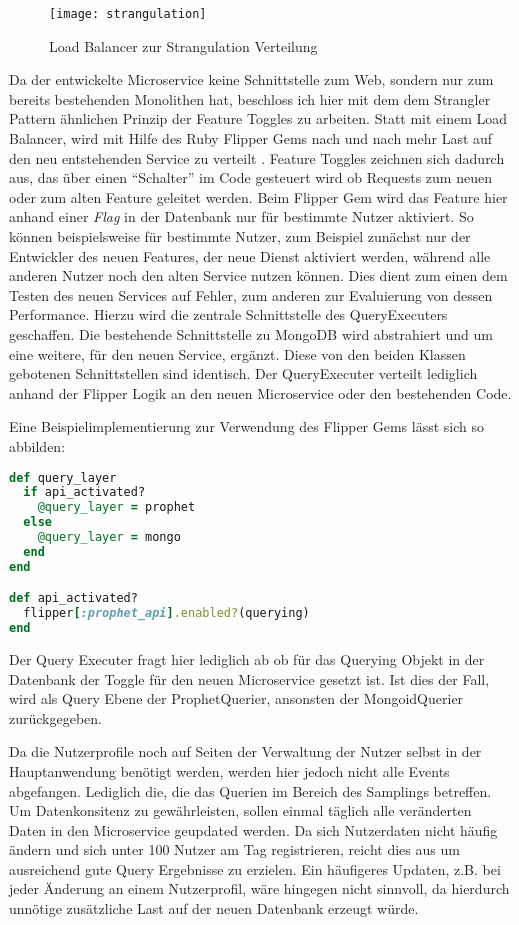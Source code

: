 \begin{figure}[h]
    \caption{Load Balancer zur Strangulation Verteilung \cite{Hammant:Strangler}}
    \texttt{[image: strangulation]}
\end{figure}

Da der entwickelte Microservice keine Schnittstelle zum Web, sondern nur zum bereits bestehenden Monolithen hat, beschloss ich hier mit dem dem Strangler Pattern ähnlichen Prinzip der Feature Toggles\cite{fowler:featuretoggle} zu arbeiten. Statt mit einem Load Balancer, wird mit Hilfe des Ruby Flipper Gems\cite{flipper} nach und nach mehr Last auf den neu entstehenden Service zu verteilt \cite[vgl.][]{Hammant:Strangler}.
Feature Toggles zeichnen sich dadurch aus, das über einen \enquote{Schalter} im Code gesteuert wird ob Requests zum neuen oder zum alten Feature geleitet werden. Beim Flipper Gem wird das Feature hier anhand einer \textit{Flag} in der Datenbank nur für bestimmte Nutzer aktiviert. So können beispielsweise für bestimmte Nutzer, zum Beispiel zunächst nur der Entwickler des neuen Features, der neue Dienst aktiviert werden, während alle anderen Nutzer noch den alten Service nutzen können. Dies dient zum einen dem Testen des neuen Services auf Fehler, zum anderen zur Evaluierung von dessen Performance.
Hierzu wird die zentrale Schnittstelle des QueryExecuters geschaffen. Die bestehende Schnittstelle zu MongoDB wird abstrahiert und um eine weitere, für den neuen Service, ergänzt. Diese von den beiden Klassen gebotenen Schnittstellen sind identisch. Der QueryExecuter verteilt lediglich anhand der Flipper Logik an den neuen Microservice oder den bestehenden Code.

Eine Beispielimplementierung zur Verwendung des Flipper Gems lässt sich so abbilden:
\begin{lstlisting}[language=Ruby]
def query_layer
  if api_activated?
    @query_layer = prophet
  else
    @query_layer = mongo
  end
end

def api_activated?
  flipper[:prophet_api].enabled?(querying)
end
\end{lstlisting}
Der Query Executer fragt hier lediglich ab ob für das Querying Objekt in der Datenbank der Toggle für den neuen Microservice gesetzt ist. Ist dies der Fall, wird als Query Ebene der ProphetQuerier, ansonsten der MongoidQuerier zurückgegeben.

Da die Nutzerprofile noch auf Seiten der Verwaltung der Nutzer selbst in der Hauptanwendung benötigt werden, werden hier jedoch nicht alle Events abgefangen. Lediglich die, die das Querien im Bereich des Samplings betreffen. Um Datenkonsitenz zu gewährleisten, sollen einmal täglich alle veränderten Daten in den Microservice geupdated werden. Da sich Nutzerdaten nicht häufig ändern und sich unter 100 Nutzer am Tag registrieren, reicht dies aus um ausreichend gute Query Ergebnisse zu erzielen. Ein häufigeres Updaten, z.B. bei jeder Änderung an einem Nutzerprofil, wäre hingegen nicht sinnvoll, da hierdurch unnötige zusätzliche Last auf der neuen Datenbank erzeugt würde.